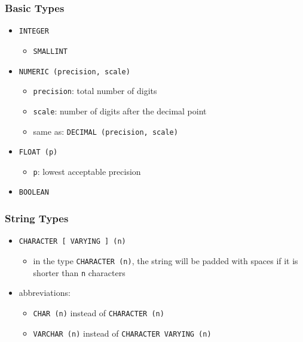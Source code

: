 \documentclass[dvipsnames]{beamer}
\theoremstyle{plain}
\begin{document}
\begin{frame}
  \frametitle{Basic Types}

  \begin{itemize}
    \item \lstinline!INTEGER!
    \begin{itemize}
      \item \lstinline!SMALLINT!
    \end{itemize}

    \pause
    \medskip
    \item \lstinline!NUMERIC (precision, scale)!
    \begin{itemize}
      \item \texttt{precision}: total number of digits
      \item \texttt{scale}: number of digits after the decimal point
      \item same as: \lstinline!DECIMAL (precision, scale)!
    \end{itemize}

    \pause
    \medskip
    \item \lstinline!FLOAT (p)!
    \begin{itemize}
      \item \texttt{p}: lowest acceptable precision
    \end{itemize}

    \pause
    \medskip
    \item \lstinline!BOOLEAN!
  \end{itemize}
\end{frame}

\begin{frame}
  \frametitle{String Types}

  \begin{itemize}
    \item \lstinline!CHARACTER [ VARYING ] (n)!
    \begin{itemize}
      \item in the type \lstinline!CHARACTER (n)!, the string will be padded
        with spaces if it is shorter than \texttt{n} characters
    \end{itemize}

    \pause
    \item abbreviations:
    \begin{itemize}
      \item \lstinline!CHAR (n)! instead of \lstinline!CHARACTER (n)!
      \item \lstinline!VARCHAR (n)! instead of \lstinline!CHARACTER VARYING (n)!
    \end{itemize}
  \end{itemize}
\end{frame}
\end{document}
